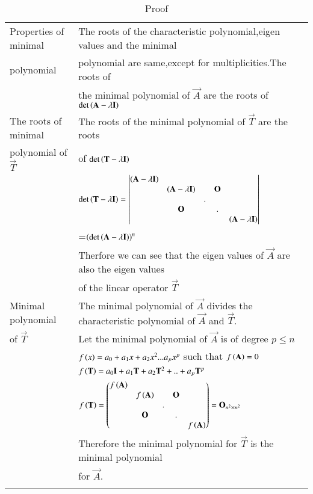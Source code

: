 \documentclass[journal,12pt]{IEEEtran}
\begin{document}
\begin{longtable}{|l|l|}
    \hline
        Properties of minimal & The roots of the characteristic polynomial,eigen values and the minimal  \\
        polynomial &polynomial are same,except for multiplicities.The roots of\\
        & the minimal polynomial of $\vec{A}$ are the roots of $\det\left(\mathbf{A}-\lambda\mathbf{I}\right)$\\
    \hline
        The roots of minimal & The roots of the minimal polynomial of $\vec{T}$ are the roots\\
        polynomial of $\vec{T}$& of $\det \left(\mathbf{T}-\lambda\mathbf{I}\right)$\\
        &$\det \left(\mathbf{T}-\lambda\mathbf{I}\right)=\begin{vmatrix}\left(\mathbf{A}-\lambda\mathbf{I}\right)&&&&\\&\left(\mathbf{A}-\lambda\mathbf{I}\right)&&\mathbf{O}&\\&&.&&\\&\mathbf{O}&&.&\\&&&&\left(\mathbf{A}-\lambda\mathbf{I}\right)\end{vmatrix}$\\
        &=$\left(\det \left(\mathbf{A}-\lambda\mathbf{I}\right)\right)^{n}$\\
        & Therfore we can see that the eigen values of $\vec{A}$ are also the eigen values \\
        &of the linear operator $\vec{T}$\\
    \hline
        Minimal polynomial  & The minimal polynomial of $\vec{A}$ divides the characteristic polynomial of $\vec{A}$ and  $\vec{T}$.\\
        of $\vec{T}$ & Let the minimal polynomial of $\vec{A}$ is of degree $p\leq n$\\
        & $f\left(x\right)=a_0+a_1x+a_2x^2...a_px^p$ such that $f\left(\mathbf{A}\right)=0$\\
        &$f\left(\mathbf{T}\right)=a_0\mathbf{I}+a_1\mathbf{T}+a_2\mathbf{T}^2+..+a_p\mathbf{T}^p$\\
    \hline
        &$f\left(\mathbf{T}\right)=\begin{pmatrix}f\left(\mathbf{A}\right)&&&&\\&f\left(\mathbf{A}\right)&&\mathbf{O}&\\&&.&&\\&\mathbf{O}&&.&\\&&&&f\left(\mathbf{A}\right)\end{pmatrix}=\mathbf{O}_{n^2\times n^2}$\\
        &Therefore the minimal polynomial for $\vec{T}$ is the minimal polynomial\\
        & for $\vec{A}$.\\
    \hline
    \caption{Proof}
    \label{tab:construction}
\end{longtable}
\end{document}
